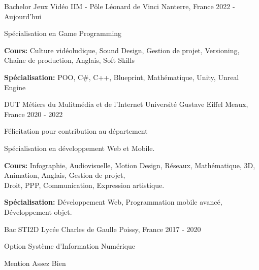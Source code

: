

\begin{cventries}

  \cventry
    {Bachelor Jeux Vidéo} %
    {IIM - Pôle Léonard de Vinci} %
    {Nanterre, France} %
    {2022 - Aujourd'hui} %
    {
      \begin{cvitems} %
        \item {Spécialisation en Game Programming}
        \item {\textbf{Cours:} Culture vidéoludique, Sound Design, Gestion de projet, Versioning, Chaîne de production, Anglais, Soft Skills}
        \item {\textbf{Spécialisation:} POO, C\#, C++, Blueprint, Mathématique, Unity, Unreal Engine}
      \end{cvitems}
    }
    
  \cventry
    {DUT Métiers du Mulitmédia et de l'Internet} %
    {Université Gustave Eiffel} %
    {Meaux, France} %
    {2020 - 2022} %
    {
      \begin{cvitems} %
        \item {Félicitation pour contribution au département}
        \item {Spécialisation en développement Web et Mobile.}
        \item {{\textbf{Cours:} Infographie, Audiovisuelle, Motion Design, Réseaux, Mathématique, 3D, Animation, Anglais, Gestion de projet, \\ Droit, PPP, Communication, Expression artistique.}} 
        \item {\textbf{Spécialisation:} Développement Web, Programmation mobile avancé, Développement objet.}
      \end{cvitems}
    }
    
  \cventry
    {Bac STI2D} %
    {Lycée Charles de Gaulle} %
    {Poissy, France} %
    {2017 - 2020} %
    {
      \begin{cvitems} %
        \item {Option Système d'Information Numérique}
        \item {Mention Assez Bien}
      \end{cvitems}
    }
\end{cventries}
